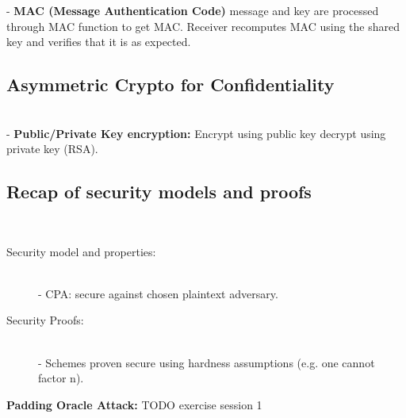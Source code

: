 - \textbf{MAC (Message Authentication Code)} message and key are processed through MAC function to get MAC. Receiver recomputes MAC using the shared key and verifies that it is as expected.\\

\subsection{Asymmetric Crypto for Confidentiality} \\

- \textbf{Public/Private Key encryption:} Encrypt using public key decrypt using private key (RSA).

\subsection{Recap of security models and proofs}\\

\begin{description}
\item[Security model and properties:]\hfill \\
    - CPA: secure against chosen plaintext adversary.
\item[Security Proofs:]\hfill \\
    - Schemes proven secure using hardness assumptions (e.g. one cannot factor n).\\
\end{description}

\textbf{Padding Oracle Attack: }TODO exercise session 1